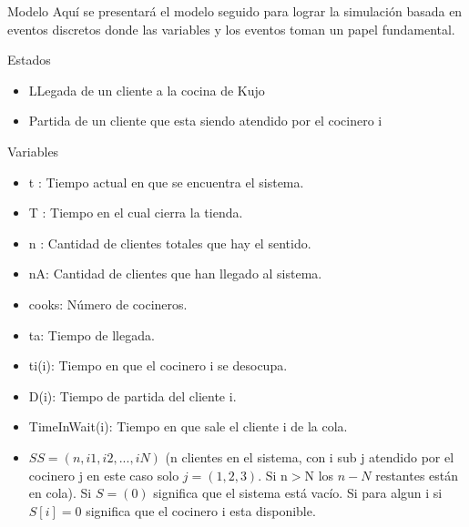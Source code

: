 \documentclass[]{article}
\begin{document}
 

\begin{section} {Modelo}
	Aqu\'{i} se presentar\'{a} el modelo seguido para lograr la simulaci\'{o}n basada en eventos discretos donde las variables y los eventos toman un papel fundamental.  

\begin{subsection} {Estados}
	\begin{itemize}
		\item LLegada de un cliente a la cocina de Kujo
		\item Partida de un cliente que esta siendo atendido por el cocinero i  
	\end{itemize}
\end{subsection}

\begin{subsection} {Variables }
		\begin{itemize}
		\item t :			Tiempo actual en que se encuentra el sistema.
		
		\item T :	    	Tiempo en el cual cierra la tienda.
		
		\item n :			Cantidad de clientes totales que hay el sentido.
		
		\item nA: 			Cantidad de clientes que han llegado al sistema.
		
		\item cooks: 		N\'{u}mero de cocineros.
		
		\item ta: 			Tiempo de llegada.
		
		\item ti(i): 		Tiempo en que el cocinero i se desocupa.
		
		\item D(i):  		Tiempo de partida del cliente i.
		
		\item TimeInWait(i): Tiempo en que sale el cliente i de la cola. 
		
		\item $SS = (n, i1 , i2 ,... ,iN )$ (n clientes en el sistema, con i sub j  atendido por el cocinero j en este caso solo $j=(1,2,3)$. Si n$>$N los $n-N$ restantes est\'{a}n en cola). Si $S=(0)$ significa que el sistema est\'{a} vac\'{i}o. Si para algun i si $S[i]=0$ significa que el cocinero i esta disponible. 
		 	 	  		 

\end{itemize}
\end{subsection}
\end{section}
\end{document}
